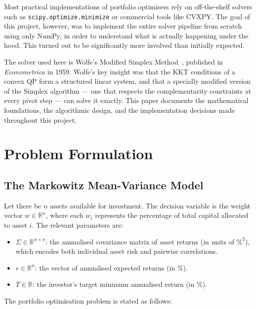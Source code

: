 \documentclass[conference]{IEEEtran}
\begin{document}
Most practical implementations of portfolio optimisers rely on off-the-shelf
solvers such as \texttt{scipy.optimize.minimize} or commercial tools like
CVXPY. The goal of this project, however, was to implement the entire solver
pipeline from scratch using only NumPy, in order to understand what is
actually happening under the hood. This turned out to be significantly more
involved than initially expected.

The solver used here is Wolfe's Modified Simplex Method~\cite{wolfe1959},
published in \textit{Econometrica} in 1959. Wolfe's key insight was that the
KKT conditions of a convex QP form a structured linear system, and that a
specially modified version of the Simplex algorithm --- one that respects the
complementarity constraints at every pivot step --- can solve it exactly. This
paper documents the mathematical foundations, the algorithmic design, and the
implementation decisions made throughout this project.

\section{Problem Formulation}

\subsection{The Markowitz Mean-Variance Model}

Let there be $n$ assets available for investment. The decision variable is the
weight vector $w \in \mathbb{R}^n$, where each $w_i$ represents the percentage
of total capital allocated to asset $i$. The relevant parameters are:

\begin{itemize}
    \item $\Sigma \in \mathbb{R}^{n \times n}$: the annualised covariance matrix
          of asset returns (in units of $\%^2$), which encodes both individual
          asset risk and pairwise correlations.
    \item $r \in \mathbb{R}^n$: the vector of annualised expected returns (in \%).
    \item $T \in \mathbb{R}$: the investor's target minimum annualised return
          (in \%).
\end{itemize}

The portfolio optimisation problem is stated as follows:
\end{document}
